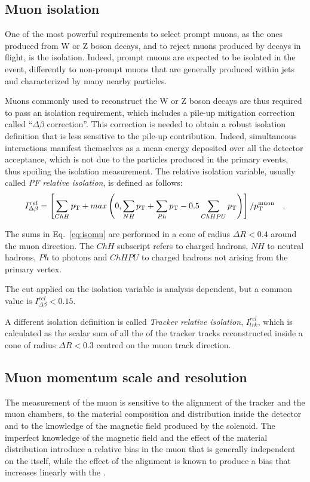 \subsection{Muon isolation}
One of the most powerful requirements to select prompt muons, as the ones produced from W or Z boson decays, and to reject muons produced by decays in flight, is the isolation. Indeed, prompt muons are expected to be isolated in the event, differently to non-prompt muons that are generally produced within jets and characterized by many nearby particles.

Muons commonly used to reconstruct the W or Z boson decays are thus required to pass an isolation requirement, which includes a pile-up mitigation correction called ``$\Delta\beta$ correction''. This correction is needed to obtain a robust isolation definition that is less sensitive to the pile-up contribution. Indeed, simultaneous interactions manifest themselves as a mean energy deposited over all the detector acceptance, which is not due to the particles produced in the primary events, thus spoiling the isolation measurement. The relative isolation variable, usually called \emph{PF relative isolation}, is defined as follows:
\begin{equation}\label{eq:isomu}
I^{rel}_{\Delta\beta} = \left[  \sum_{ChH}p_\mathrm{T} + max\left(0, \sum_{NH}p_\mathrm{T} + \sum_{Ph}p_\mathrm{T} - 0.5\sum_{ChHPU}p_\mathrm{T}    \right)  \right]/p_\mathrm{T}^\mathrm{muon} \quad .
\end{equation}

The sums in Eq.~\eqref{eq:isomu} are performed in a cone of radius $\Delta R < 0.4$ around the muon direction. The $ChH$ subscript refers to charged hadrons, $NH$ to neutral hadrons, $Ph$ to photons and $ChHPU$ to charged hadrons not arising from the primary vertex.

The cut applied on the isolation variable is analysis dependent, but a common value is $I^{rel}_{\Delta\beta} < 0.15$.

A different isolation definition is called \emph{Tracker relative isolation}, $I^{rel}_{trk}$, which is calculated as the scalar sum of all the \pt of the tracker tracks reconstructed inside a cone of radius $\Delta R < 0.3$ centred on the muon track direction.

\subsection{Muon momentum scale and resolution}
The measurement of the muon \pt is sensitive to the alignment of the tracker and the muon chambers, to the material composition and distribution inside the detector and to the knowledge of the magnetic field produced by the solenoid. The imperfect knowledge of the magnetic field and the effect of the material distribution introduce a relative bias in the muon \pt that is generally independent on the \pt itself, while the effect of the alignment is known to produce a bias that increases linearly with the \pt.

